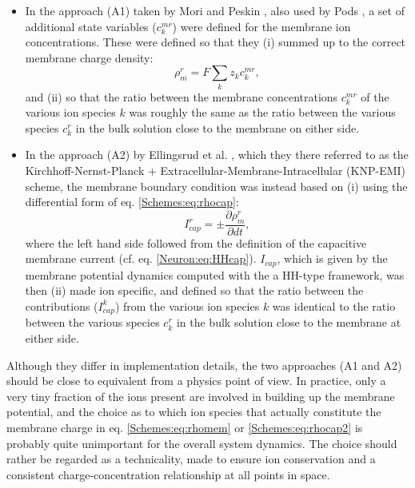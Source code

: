 \begin{itemize}

\item In the approach (A1) taken by Mori and Peskin \citep{Mori2006, Mori2009}, also used by Pods \citep{Pods2017}, a set of additional state variables ($c_k^{mr}$) were defined for the membrane ion concentrations. These were defined so that they (i) summed up to the correct membrane charge density: 
\begin{equation}
\rho_{m}^r = F \sum_k z_k c_k^{mr},
\label{Schemes:eq:rhomem}
\end{equation}
and (ii) so that the ratio between the membrane concentrations $c_k^{mr}$ of the various ion species $k$ was roughly the same as the ratio between the various species $c_k^r$ in the bulk solution close to the membrane on either side. 

\item In the approach (A2) by Ellingsrud et al. \citep{ellingsrud2020}, which they there referred to as the Kirchhoff-Nernst-Planck + Extracellular-Membrane-Intracellular (KNP-EMI) scheme, the membrane boundary condition was instead based on (i) using the differential form of eq. \ref{Schemes:eq:rhocap}:
\begin{equation}
I_{cap}^r = \pm \frac{\partial \rho_{m}^r}{\partial dt}, 
\label{Schemes:eq:rhocap2}
\end{equation}
where the left hand side followed from the definition of the capacitive membrane current (cf. eq. \ref{Neuron:eq:HHcap}). $I_{cap}$, which is given by the membrane potential dynamics computed with the a HH-type framework, was then (ii) made ion specific, and defined so that the ratio between the contributions ($I^k_{cap}$) from the various ion species $k$ was identical to the ratio between the various species $c_k^r$ in the bulk solution close to the membrane at either side.
\end{itemize}

Although they differ in implementation details, the two approaches (A1 and A2) should be close to equivalent from a physics point of view. In practice, only a very tiny fraction of the ions present are involved in building up the membrane potential, and the choice as to which ion species that actually constitute the membrane charge in eq. \ref{Schemes:eq:rhomem} or \ref{Schemes:eq:rhocap2} is probably quite unimportant for the overall system dynamics. The choice should rather be regarded as a technicality, made to ensure ion conservation and a consistent charge-concentration relationship at all points in space. 


